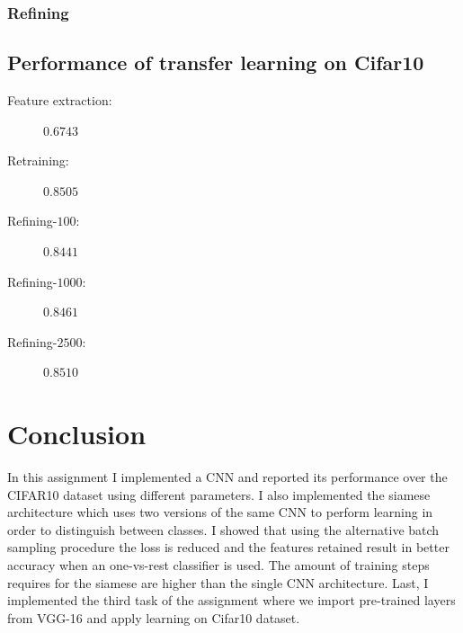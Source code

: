 \documentclass{article}
\begin{document}
\subsubsection{Refining}


\subsection{Performance of transfer learning on Cifar10}
\begin{description}
\item[Feature extraction:]{$0.6743$}
\item[Retraining:]{$0.8505$}
\item[Refining-$100$:]{$0.8441$}
\item[Refining-$1000$:]{$0.8461$}
\item[Refining-$2500$:]{$\mathbf{0.8510}$}
\end{description}

 

\section{Conclusion}

In this assignment I implemented a CNN and reported its performance over the CIFAR10 dataset using different parameters.
I also implemented the siamese architecture which uses two versions of the same CNN to perform learning in order to distinguish between classes.
I showed that using the alternative batch sampling procedure the loss is reduced and the features retained result in better accuracy when an one-vs-rest classifier is used.
The amount of training steps requires for the siamese are higher than the single CNN architecture.
Last, I implemented the third task of the assignment where we import pre-trained layers from VGG-16 and apply learning on Cifar10 dataset.
\end{document}
